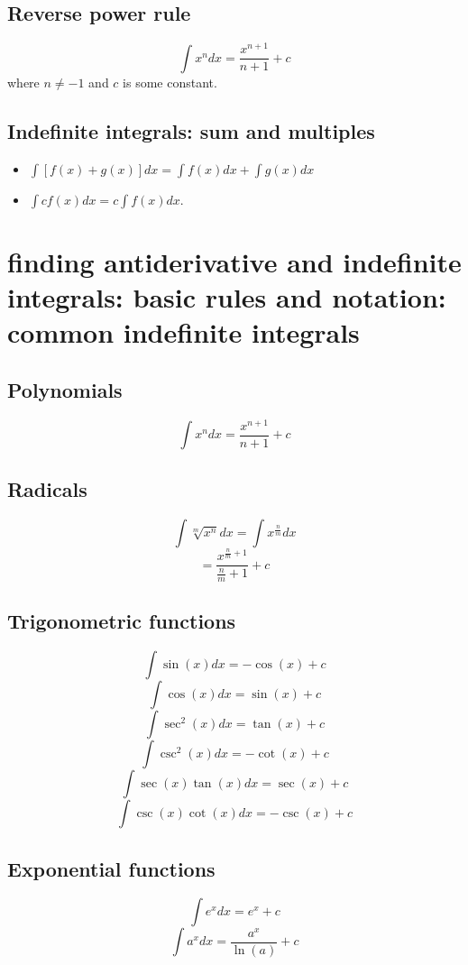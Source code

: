 \documentclass{article}
\begin{document}
                    \subsection{Reverse power rule}
                        \[\int x^{n}dx = \frac{x^{n + 1}}{n + 1} + c \]
                     where \(n \neq -1 \) and \(c\) is some constant. 
                     \subsection{Indefinite integrals: sum and multiples}
                        \begin{itemize}
                            \item \(\int[f(x) + g(x)]dx = \int f(x)dx + \int g(x)dx\)
                            \item \(\int c f(x) dx = c \int f(x)dx\).
                        \end{itemize}
        \section{finding antiderivative and indefinite integrals: basic rules and notation: common indefinite integrals}
                        \subsection{Polynomials}
                            \[\int x^{n} dx = \frac{x^{n + 1}}{n + 1} + c\]
                        \subsection{Radicals}
                            \[\int \sqrt[m]{x^{n}} dx = \int x^{\frac{n}{m}} dx\]
                            \[= \frac{x^{\frac{n}{m} + 1}}{\frac{n}{m} + 1} + c\]
                        \subsection{Trigonometric functions}
                            \[\int \sin (x) dx = -\cos (x) + c\]
                            \[\int \cos (x) dx = \sin (x) + c\]
                            \[\int \sec^{2} (x) dx = \tan (x) + c\]
                            \[\int \csc^{2} (x) dx = -\cot (x) + c\]
                            \[\int \sec (x) \tan (x) dx = \sec (x) + c\]
                            \[\int \csc (x) \cot (x) dx = -\csc (x) + c\]
                        \subsection{Exponential functions}
                            \[\int e^x dx = e^x + c\]
                            \[\int a^x dx = \frac{a^{x}}{\ln(a)} + c\]
\end{document}
